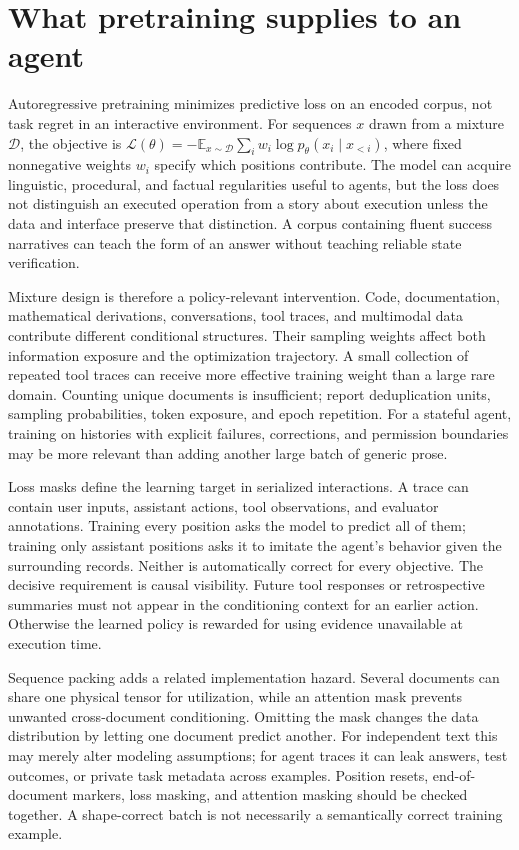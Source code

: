 \section{What pretraining supplies to an agent}
\label{sec:C07:objective}
Autoregressive pretraining minimizes predictive loss on an encoded corpus, not task regret in an interactive environment. For sequences $x$ drawn from a mixture $\mathcal D$, the objective is $\mathcal L(\theta)=-\mathbb E_{x\sim\mathcal D}\sum_i w_i\log p_\theta(x_i\mid x_{<i})$, where fixed nonnegative weights $w_i$ specify which positions contribute. The model can acquire linguistic, procedural, and factual regularities useful to agents, but the loss does not distinguish an executed operation from a story about execution unless the data and interface preserve that distinction. A corpus containing fluent success narratives can teach the form of an answer without teaching reliable state verification.

Mixture design is therefore a policy-relevant intervention. Code, documentation, mathematical derivations, conversations, tool traces, and multimodal data contribute different conditional structures. Their sampling weights affect both information exposure and the optimization trajectory. A small collection of repeated tool traces can receive more effective training weight than a large rare domain. Counting unique documents is insufficient; report deduplication units, sampling probabilities, token exposure, and epoch repetition. For a stateful agent, training on histories with explicit failures, corrections, and permission boundaries may be more relevant than adding another large batch of generic prose.

Loss masks define the learning target in serialized interactions. A trace can contain user inputs, assistant actions, tool observations, and evaluator annotations. Training every position asks the model to predict all of them; training only assistant positions asks it to imitate the agent's behavior given the surrounding records. Neither is automatically correct for every objective. The decisive requirement is causal visibility. Future tool responses or retrospective summaries must not appear in the conditioning context for an earlier action. Otherwise the learned policy is rewarded for using evidence unavailable at execution time.

Sequence packing adds a related implementation hazard. Several documents can share one physical tensor for utilization, while an attention mask prevents unwanted cross-document conditioning. Omitting the mask changes the data distribution by letting one document predict another. For independent text this may merely alter modeling assumptions; for agent traces it can leak answers, test outcomes, or private task metadata across examples. Position resets, end-of-document markers, loss masking, and attention masking should be checked together. A shape-correct batch is not necessarily a semantically correct training example.


